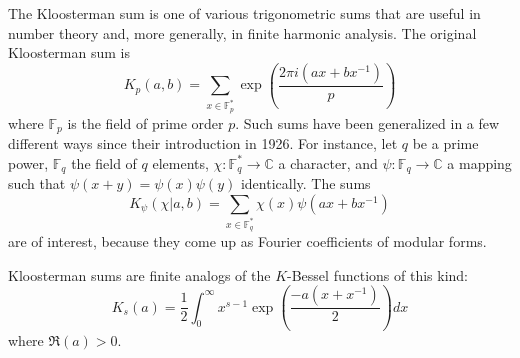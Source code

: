 \documentclass[12pt]{article}
\newcommand{\C}{\mathbb{C}}
\newcommand{\Fpstar}{\mathbb{F}_p^*}
\newcommand{\Fqstar}{\mathbb{F}_q^*}
\newcommand{\Fp}{\mathbb{F}_p}
\newcommand{\Fq}{\mathbb{F}_q}
\begin{document}

The Kloosterman sum is one of various trigonometric sums that are
useful in number theory and, more generally, in finite harmonic
analysis.
The original Kloosterman sum is
$$K_p(a,b)=\sum_{x\in\Fpstar}
\exp \left( \frac{2\pi i(ax+bx^{-1})}{p} \right) $$
where $\Fp$ is the field of prime order $p$.
Such sums have been generalized
in a few different ways since their introduction in 1926.
For instance, let $q$ be a prime power, $\Fq$ the field
of $q$ elements, $\chi:\Fqstar\to\C$ a character, and
$\psi:\Fq\to\C$
a mapping such that $\psi(x+y)=\psi(x)\psi(y)$ identically.
The sums
$$K_\psi(\chi|a,b)=\sum_{x\in\Fqstar}\chi(x)\psi(ax+bx^{-1})$$
are of interest, because they come up as Fourier coefficients
of modular forms.

Kloosterman sums are finite analogs of the $K$-Bessel
functions of this kind:
$$K_s(a)=\frac{1}{2}
\int_0^\infty
x^{s-1}\exp\left(\frac{-a(x+x^{-1})}{2}\right) dx$$
where $\Re(a)>0$.
\end{document}
